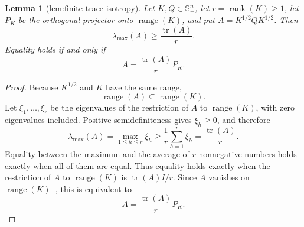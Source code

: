 \documentclass{article}
\newtheorem{lemma}{Lemma}
\begin{document}
\begin{lemma}[lem:finite-trace-isotropy]\label{lem:finite-trace-isotropy}
Let \(K,Q\in\mathbb S_+^n\), let \(r=\operatorname{rank}(K)\ge1\), let \(P_K\) be the orthogonal projector onto \(\operatorname{range}(K)\), and put \(A=K^{1/2}QK^{1/2}\). Then
\[
\lambda_{\max}(A)\ge \frac{\operatorname{tr}(A)}r.
\]
Equality holds if and only if
\[
A=\frac{\operatorname{tr}(A)}rP_K.
\]
\end{lemma}
\begin{proof}
Because \(K^{1/2}\) and \(K\) have the same range,
\[
\operatorname{range}(A)\subseteq\operatorname{range}(K).
\]
Let \(\xi_1,\ldots,\xi_r\) be the eigenvalues of the restriction of \(A\) to \(\operatorname{range}(K)\), with zero eigenvalues included. Positive semidefiniteness gives \(\xi_h\ge0\), and therefore
\[
\lambda_{\max}(A)=\max_{1\le h\le r}\xi_h
\ge \frac1r\sum_{h=1}^r\xi_h
=\frac{\operatorname{tr}(A)}r.
\]
Equality between the maximum and the average of \(r\) nonnegative numbers holds exactly when all of them are equal. Thus equality holds exactly when the restriction of \(A\) to \(\operatorname{range}(K)\) is \(\operatorname{tr}(A)I/r\). Since \(A\) vanishes on \(\operatorname{range}(K)^\perp\), this is equivalent to
\[
A=\frac{\operatorname{tr}(A)}rP_K.
\]
\end{proof}
\end{document}
